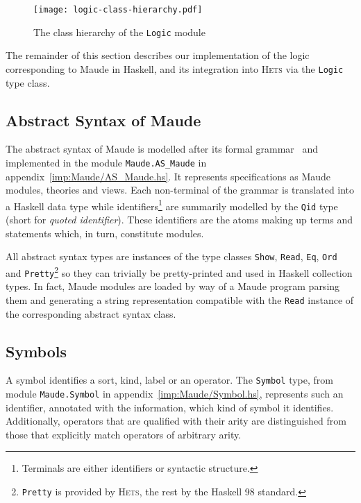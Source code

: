 \documentclass[11pt]{article}
\newcommand{\Hets}{\textsc{Hets}}
\begin{document}
\begin{figure}[htbp]
  \texttt{[image: logic-class-hierarchy.pdf]}
  \caption{The class hierarchy of the \texttt{Logic} module}\label{fig:logic-class-hierarchy}
\end{figure}

The remainder of this section describes our implementation of the logic corresponding to Maude in Haskell, and its integration into \Hets{} via the \texttt{Logic} type class.


\subsection{Abstract Syntax of Maude}
\label{sub:implementation_abstract_syntax}

The abstract syntax of Maude is modelled after its formal grammar~\cite{Clavel:2007} and implemented in the module \texttt{Maude.AS\_Maude} in appendix~\ref{imp:Maude/AS_Maude.hs}. It represents specifications as Maude modules, theories and views. Each non-terminal of the grammar is translated into a Haskell data type while identifiers\footnote{Terminals are either identifiers or syntactic structure.} are summarily modelled by the \texttt{Qid} type (short for \emph{quoted identifier}). These identifiers are the atoms making up terms and statements which, in turn, constitute modules.

All abstract syntax types are instances of the type classes \texttt{Show}, \texttt{Read}, \texttt{Eq}, \texttt{Ord} and \texttt{Pretty}\footnote{\texttt{Pretty} is provided by \Hets{}, the rest by the Haskell 98 standard.} so they can trivially be pretty-printed and used in Haskell collection types. In fact, Maude modules are loaded by way of a Maude program parsing them and generating a string representation compatible with the \texttt{Read} instance of the corresponding abstract syntax class.


\subsection{Symbols}
\label{sub:implementation_symbols}

A symbol identifies a sort, kind, label or an operator. The \texttt{Symbol} type, from module \texttt{Maude.Symbol} in appendix~\ref{imp:Maude/Symbol.hs}, represents such an identifier, annotated with the information, which kind of symbol it identifies. Additionally, operators that are qualified with their arity are distinguished from those that explicitly match operators of arbitrary arity.
\end{document}
